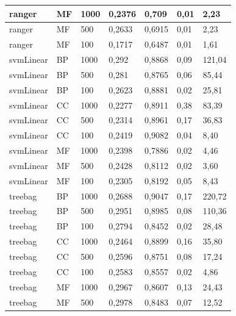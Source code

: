 \documentclass[12pt]{report}
\begin{document}
\begin{appendices}
\begin{longtable}[h]{|l|l|l|l|l|l|l|}
ranger       & MF   & 1000    & 0,2376 & 0,709  & 0,01            & 2,23        \\ \hline
ranger       & MF   & 500     & 0,2633 & 0,6915 & 0,01            & 2,23        \\ \hline
ranger       & MF   & 100     & 0,1717 & 0,6487 & 0,01            & 1,61        \\ \hline
svmLinear    & BP   & 1000    & 0,292  & 0,8868 & 0,09            & 121,04      \\ \hline
svmLinear    & BP   & 500     & 0,281  & 0,8765 & 0,06            & 85,44       \\ \hline
svmLinear    & BP   & 100     & 0,2623 & 0,8881 & 0,02            & 25,81       \\ \hline
svmLinear    & CC   & 1000    & 0,2277 & 0,8911 & 0,38            & 83,39       \\ \hline
svmLinear    & CC   & 500     & 0,2314 & 0,8961 & 0,17            & 36,83       \\ \hline
svmLinear    & CC   & 100     & 0,2419 & 0,9082 & 0,04            & 8,40        \\ \hline
svmLinear    & MF   & 1000    & 0,2398 & 0,7886 & 0,02            & 4,46        \\ \hline
svmLinear    & MF   & 500     & 0,2428 & 0,8112 & 0,02            & 3,60        \\ \hline
svmLinear    & MF   & 100     & 0,2305 & 0,8192 & 0,05            & 8,43        \\ \hline
treebag      & BP   & 1000    & 0,2688 & 0,9047 & 0,17            & 220,72      \\ \hline
treebag      & BP   & 500     & 0,2951 & 0,8985 & 0,08            & 110,36      \\ \hline
treebag      & BP   & 100     & 0,2794 & 0,8452 & 0,02            & 28,48       \\ \hline
treebag      & CC   & 1000    & 0,2464 & 0,8899 & 0,16            & 35,80       \\ \hline
treebag      & CC   & 500     & 0,2596 & 0,8751 & 0,08            & 17,24       \\ \hline
treebag      & CC   & 100     & 0,2583 & 0,8557 & 0,02            & 4,86        \\ \hline
treebag      & MF   & 1000    & 0,2967 & 0,8607 & 0,13            & 24,43       \\ \hline
treebag      & MF   & 500     & 0,2978 & 0,8483 & 0,07            & 12,52       \\ \hline

\end{longtable}
\end{appendices}
\end{document}

